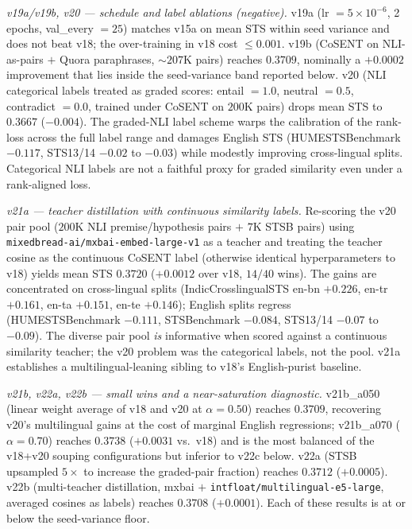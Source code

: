 \documentclass[
  11pt]{article}
\begin{document}
\emph{v19a/v19b, v20 --- schedule and label ablations (negative).} v19a
(lr \(= 5 \times 10^{-6}\), 2 epochs, val\_every \(= 25\)) matches v15a
on mean STS within seed variance and does not beat v18; the
over-training in v18 cost \(\leq 0.001\). v19b (CoSENT on NLI-as-pairs
\(+\) Quora paraphrases, \(\sim 207\)K pairs) reaches \(0.3709\),
nominally a \(+0.0002\) improvement that lies inside the seed-variance
band reported below. v20 (NLI categorical labels treated as graded
scores: entail \(= 1.0\), neutral \(= 0.5\), contradict \(= 0.0\),
trained under CoSENT on \(200\)K pairs) drops mean STS to \(0.3667\)
(\(-0.004\)). The graded-NLI label scheme warps the calibration of the
rank-loss across the full label range and damages English STS
(HUMESTSBenchmark \(-0.117\), STS13/14 \(-0.02\) to \(-0.03\)) while
modestly improving cross-lingual splits. Categorical NLI labels are not
a faithful proxy for graded similarity even under a rank-aligned loss.

\emph{v21a --- teacher distillation with continuous similarity labels.}
Re-scoring the v20 pair pool (\(200\)K NLI premise/hypothesis pairs
\(+\) \(7\)K STSB pairs) using
\texttt{mixedbread-ai/mxbai-embed-large-v1} as a teacher and treating
the teacher cosine as the continuous CoSENT label (otherwise identical
hyperparameters to v18) yields mean STS \(0.3720\) (\(+0.0012\) over
v18, \(14/40\) wins). The gains are concentrated on cross-lingual splits
(IndicCrosslingualSTS en-bn \(+0.226\), en-tr \(+0.161\), en-ta
\(+0.151\), en-te \(+0.146\)); English splits regress (HUMESTSBenchmark
\(-0.111\), STSBenchmark \(-0.084\), STS13/14 \(-0.07\) to \(-0.09\)).
The diverse pair pool \emph{is} informative when scored against a
continuous similarity teacher; the v20 problem was the categorical
labels, not the pool. v21a establishes a multilingual-leaning sibling to
v18's English-purist baseline.

\emph{v21b, v22a, v22b --- small wins and a near-saturation diagnostic.}
v21b\_a050 (linear weight average of v18 and v20 at \(\alpha = 0.50\))
reaches \(0.3709\), recovering v20's multilingual gains at the cost of
marginal English regressions; v21b\_a070 (\(\alpha = 0.70\)) reaches
\(0.3738\) (\(+0.0031\) vs.~v18) and is the most balanced of the v18+v20
souping configurations but inferior to v22c below. v22a (STSB upsampled
\(5\times\) to increase the graded-pair fraction) reaches \(0.3712\)
(\(+0.0005\)). v22b (multi-teacher distillation, mxbai \(+\)
\texttt{intfloat/multilingual-e5-large}, averaged cosines as labels)
reaches \(0.3708\) (\(+0.0001\)). Each of these results is at or below
the seed-variance floor.
\end{document}
